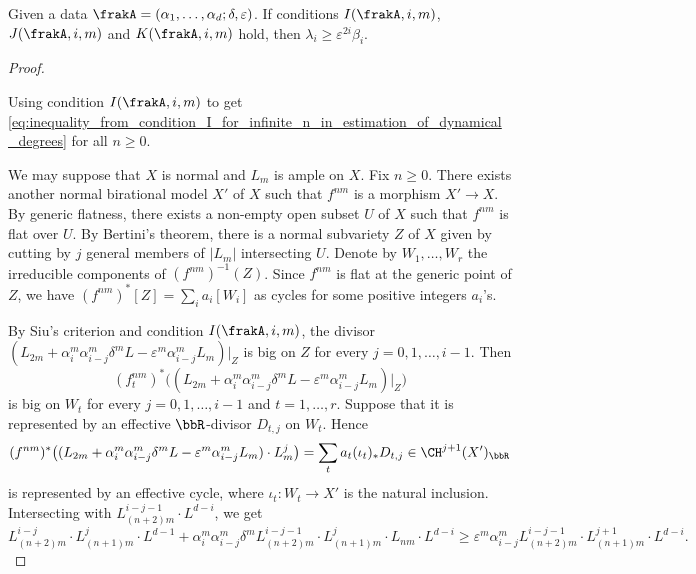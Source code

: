   \begin{theorem}\label{thm:conditions_IJK_implies_estimation_of_dynamical_degrees}
    Given a data $\frakA = (\alpha_1, \ldots, \alpha_d; \delta, \varepsilon)$.
    If conditions $I(\frakA,i,m)$, $J(\frakA,i,m)$ and $K(\frakA,i,m)$ hold, then $\lambda_i \geq \varepsilon^{2i} \beta_i$.
  \end{theorem}
  \begin{proof}
    \hspace{1em}
    \begin{step}
      Using condition $I(\frakA,i,m)$ to get \cref{eq:inequality_from_condition_I_for_infinite_n_in_estimation_of_dynamical_degrees} for all $n \geq 0$.
    \end{step}

    We may suppose that $X$ is normal and $L_m$ is ample on $X$.
    Fix $n \geq 0$.
    There exists another normal birational model $X'$ of $X$ such that $f^{nm}$ is a morphism $X' \to X$.
    By generic flatness, there exists a non-empty open subset $U$ of $X$ such that $f^{nm}$ is flat over $U$.
    By Bertini's theorem, there is a normal subvariety $Z$ of $X$ given by cutting by $j$ general members of $|L_m|$ intersecting $U$.
    Denote by $W_1, \ldots, W_r$ the irreducible components of $(f^{nm})^{-1}(Z)$.
    Since $f^{nm}$ is flat at the generic point of $Z$, we have $(f^{nm})^*[Z] = \sum_i a_i [W_i]$ as cycles for some positive integers $a_i$'s.

    By Siu's criterion and condition $I(\frakA,i,m)$, the divisor $(L_{2m} + \alpha_i^m \alpha_{i-j}^m \delta^m L - \varepsilon^m \alpha_{i-j}^m L_m)|_{Z}$ is big on $Z$ for every $j = 0, 1, \ldots, i-1$.
    Then 
    \[ (f^{nm}_t)^*\bigl((L_{2m} + \alpha_i^m \alpha_{i-j}^m \delta^m L - \varepsilon^m \alpha_{i-j}^m L_m)|_{Z}\bigr) \] 
    is big on $W_t$ for every $j = 0, 1, \ldots, i-1$ and $t = 1, \ldots, r$.
    Suppose that it is represented by an effective $\bbR$-divisor $D_{t,j}$ on $W_t$.
    Hence 
    \[ (f^{nm})^*\bigl((L_{2m} + \alpha_i^m \alpha_{i-j}^m \delta^m L - \varepsilon^m \alpha_{i-j}^m L_m) \cdot L_m^{j} \bigr) = \sum_t a_t (\iota_t)_*D_{t,j} \in \CH^{j+1}(X')_\bbR \]
    is represented by an effective cycle, where $\iota_t : W_t \to X'$ is the natural inclusion.
    Intersecting with $L_{(n+2)m}^{i-j-1} \cdot L^{d-i}$, we get
    \begin{equation}\label{eq:inequality_from_condition_I_for_infinite_n_in_estimation_of_dynamical_degrees}
      L_{(n+2)m}^{i-j} \cdot L_{(n+1)m}^j \cdot L^{d-1} + \alpha_{i}^m \alpha_{i-j}^m \delta^m L_{(n+2)m}^{i-j-1} \cdot L_{(n+1)m}^{j} \cdot L_{nm} \cdot L^{d-i} \geq \varepsilon^m \alpha_{i-j}^m L_{(n+2)m}^{i-j-1} \cdot L_{(n+1)m}^{j+1} \cdot L^{d-i}.
    \end{equation}



\end{proof}
